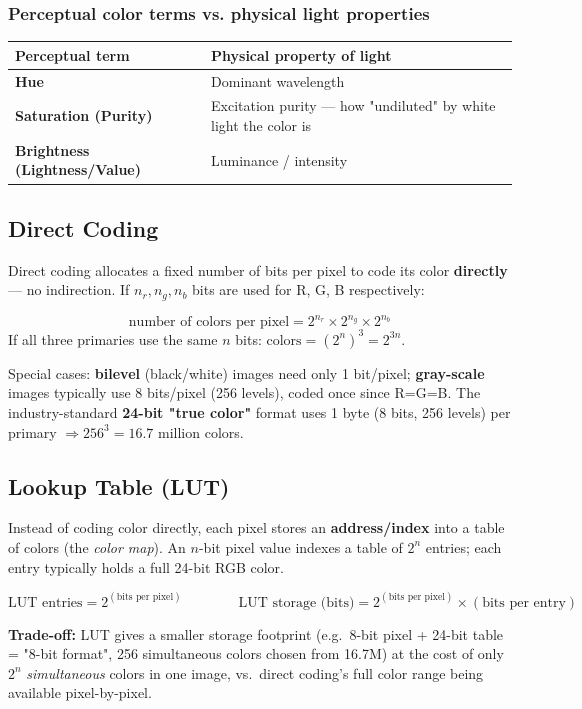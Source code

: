 \documentclass[12pt, a4paper]{article}
\newenvironment{answerbox}{\begin{mdframed}[style=answerframe]}{\end{mdframed}}
\begin{document}
\subsubsection*{Perceptual color terms vs. physical light properties}
\begin{center}
\renewcommand{\arraystretch}{1.3}
\begin{tabular}{l|l}
\toprule
\textbf{Perceptual term} & \textbf{Physical property of light} \\
\midrule
\textbf{Hue} & Dominant wavelength \\
\textbf{Saturation (Purity)} & Excitation purity --- how "undiluted" by white light the color is \\
\textbf{Brightness (Lightness/Value)} & Luminance / intensity \\
\bottomrule
\end{tabular}
\end{center}

\subsection{Direct Coding}
Direct coding allocates a fixed number of bits per pixel to code its color \textbf{directly} — no indirection. If $n_r, n_g, n_b$ bits are used for R, G, B respectively:
\begin{answerbox}
$$\text{number of colors per pixel} = 2^{n_r}\times 2^{n_g}\times 2^{n_b}$$
If all three primaries use the same $n$ bits: $\text{colors} = (2^n)^3 = 2^{3n}$.
\end{answerbox}
Special cases: \textbf{bilevel} (black/white) images need only 1 bit/pixel; \textbf{gray-scale} images typically use 8 bits/pixel (256 levels), coded once since R=G=B. The industry-standard \textbf{24-bit "true color"} format uses 1 byte (8 bits, 256 levels) per primary $\Rightarrow 256^3 = 16.7$ million colors.

\subsection{Lookup Table (LUT)}
Instead of coding color directly, each pixel stores an \textbf{address/index} into a table of colors (the \emph{color map}). An $n$-bit pixel value indexes a table of $2^n$ entries; each entry typically holds a full 24-bit RGB color.
\begin{answerbox}
$$\text{LUT entries} = 2^{(\text{bits per pixel})} \qquad\qquad \text{LUT storage (bits)} = 2^{(\text{bits per pixel})}\times(\text{bits per entry})$$
\end{answerbox}
\textbf{Trade-off:} LUT gives a smaller storage footprint (e.g.\ 8-bit pixel + 24-bit table = "8-bit format", 256 simultaneous colors chosen from 16.7M) at the cost of only $2^n$ \emph{simultaneous} colors in one image, vs.\ direct coding's full color range being available pixel-by-pixel.
\end{document}
